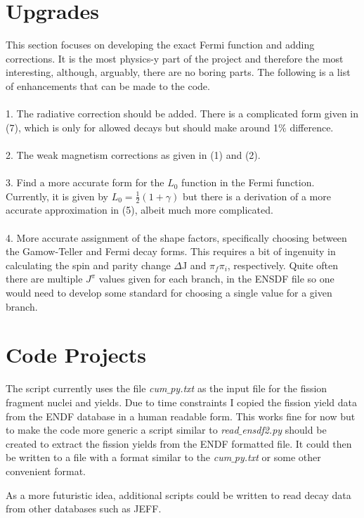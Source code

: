 \documentclass{report}
\begin{document}
\section{Upgrades}
This section focuses on developing the exact Fermi function and adding corrections. It is the most 
physics-y part of the project and therefore the most interesting, although, arguably, there are no boring parts. 
The following is a list of enhancements that can be made to the code.   \\ \\
1. The radiative correction should be added. There is a complicated form given in (7), which is 
only for allowed decays but should make around 1$\%$ difference. \\ \\
2. The weak magnetism corrections as given in (1) and (2).  \\ \\
3. Find a more accurate form for the $L_0$ function in the Fermi function. Currently, it is given by
$L_0 = \frac{1}{2}(1+\gamma)$ but there is a derivation of a more accurate approximation in (5), albeit 
much more complicated. \\ \\
4. More accurate assignment of the shape factors, specifically choosing between the 
Gamow-Teller and Fermi decay forms. This requires a bit of ingenuity in calculating the
 spin and parity change $\Delta$J and $\pi_f\pi_i$, respectively. Quite often there are multiple $J^{\pi}$
 values given for each branch, in the ENSDF file so one would need to develop some standard 
 for choosing a single value for a given branch.
 

\section{Code Projects}
The script currently uses the file \textit{cum$\_$py.txt} as the input file for the fission fragment nuclei and yields. Due 
to time constraints I copied the fission yield data from the ENDF database in a human readable form. 
This works fine for now but to make the code more generic a script similar to \textit{read$\_$ensdf2.py} 
should be created to extract the fission yields from the ENDF formatted file. It could then be written to 
a file with a format similar to the \textit{cum$\_$py.txt} or some other convenient format. 

As a more futuristic idea, additional scripts could be written to read decay data from other databases 
such as JEFF.
\end{document}
